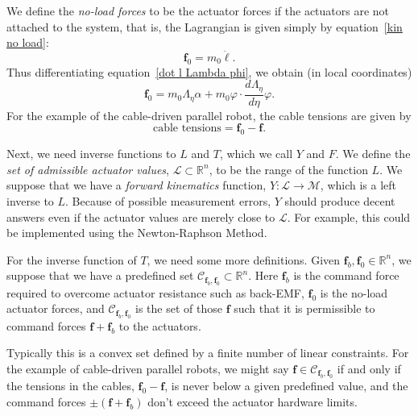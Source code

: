 \documentclass[reqno,twocolumn]{amsart}
\renewcommand{\mathsf}{}
\begin{document}
We define the \emph{no-load forces} to be the actuator forces if the actuators are not attached to the system, that is, the Lagrangian is given simply by equation~\eqref{kin no load}:
\begin{equation}
\bm f_0 = m_0 \ddot{\bm\ell}.
\end{equation}
Thus differentiating equation~\eqref{dot l Lambda phi}, we obtain (in local coordinates)
\begin{equation}
\label{f_0}
\bm f_0 = m_0 \mathsf\Lambda_\eta \alpha + m_0 \varphi \cdot \frac{d\Lambda_\eta}{d\eta} \varphi .
\end{equation}
For the example of the cable-driven parallel robot, the cable tensions are given by
\begin{equation}
\text{cable tensions} = \bm f_0 - \bm f.
\end{equation}

Next, we need inverse functions to $\mathsf L$ and $\mathsf T$, which we call $\mathsf Y$ and $\mathsf F$.  We define the \emph{set of admissible actuator values}, $\mathcal L \subset \mathbb R^n$, to be the range of the function $\mathsf L$.  We suppose that we have a \emph{forward kinematics} function, $\mathsf Y : \mathcal L \to \mathcal M$, which is a left inverse to $\mathsf L$.  Because of possible measurement errors, $\mathsf Y$ should produce decent answers even if the actuator values are merely close to $\mathcal L$.  For example, this could be implemented using the Newton-Raphson Method.

For the inverse function of $\mathsf T$, we need some more definitions.  Given $ \bm f_b, \bm f_0 \in \mathbb R^n$, we suppose that we have a predefined set $\mathcal C_{\bm f_b, \bm f_0} \subset \mathbb R^n$.  Here $\bm f_b$ is the command force required to overcome actuator resistance such as back-EMF, $\bm f_0$ is the no-load actuator forces, and $\mathcal C_{\bm f_b, \bm f_0}$ is the set of those $\bm f$ such that it is permissible to command forces $\bm f + \bm f_b$ to the actuators.

Typically this is a convex set defined by a finite number of linear constraints.  For the example of cable-driven parallel robots, we might say $\bm f \in \mathcal C_{\bm f_b, \bm f_0}$ if and only if the tensions in the cables, $\bm f_0 - \bm f$, is never below a given predefined value, and the command forces $\pm(\bm f + \bm f_b)$ don't exceed the actuator hardware limits.
\end{document}
